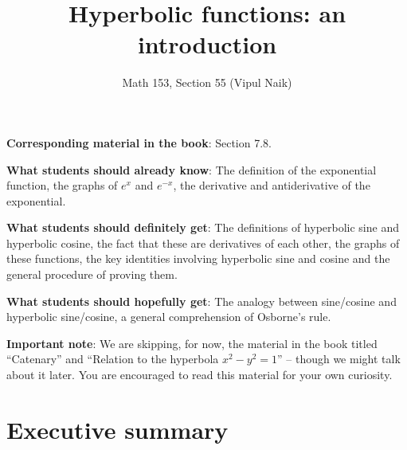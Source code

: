 \documentclass{amsart}
\title{Hyperbolic functions: an introduction}
\author{Math 153, Section 55 (Vipul Naik)}
\begin{document}
\maketitle

{\bf Corresponding material in the book}: Section 7.8.

{\bf What students should already know}: The definition of the
exponential function, the graphs of $e^x$ and $e^{-x}$, the derivative
and antiderivative of the exponential.

{\bf What students should definitely get}: The definitions of
hyperbolic sine and hyperbolic cosine, the fact that these are
derivatives of each other, the graphs of these functions, the key
identities involving hyperbolic sine and cosine and the general
procedure of proving them.

{\bf What students should hopefully get}: The analogy between
sine/cosine and hyperbolic sine/cosine, a general comprehension of
Osborne's rule.

{\bf Important note}: We are skipping, for now, the material in the
book titled ``Catenary'' and ``Relation to the hyperbola $x^2 - y^2 =
1$'' -- though we might talk about it later. You are encouraged to
read this material for your own curiosity.

\section*{Executive summary}
\end{document}
